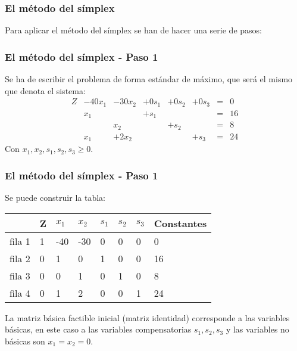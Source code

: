 \documentclass{beamer}
\begin{document}
\begin{frame}
\frametitle{El m\'etodo del s\'implex}
Para aplicar el m\'etodo del s\'implex se han de hacer una serie de pasos:
\end{frame}



\begin{frame}
\frametitle{El m\'etodo del s\'implex - Paso 1}
Se ha de escribir el problema de forma est\'andar de m\'aximo, que ser\'a el mismo que denota el sistema:
\[\left.\begin{array}{rrrrrrrr}
Z & -40x_1 & -30x_2 & +0s_1 & +0s_2& +0s_3 & = & 0 \\
 &  x_1 &  & +s_1 & &  & = & 16 \\
 &  & x_2 &  & +s_2&  & = & 8 \\
  & x_1 & +2x_2 &  & & +s_3 & = & 24 \end{array}\right.\]
Con $x_1,x_2,s_1,s_2,s_3\geq 0$.
\end{frame}

\begin{frame}
\frametitle{El m\'etodo del s\'implex - Paso 1}
Se puede construir la tabla:
\begin{tabular}{ |p{1cm}||p{0.8cm}|p{0.8cm}|p{0.8cm}|p{0.8cm}|p{0.8cm}|p{0.8cm}|p{1.6cm}|  }
 \hline
 & Z & $x_1$ & $x_2$ & $s_1$& $s_2$ & $s_3$ & Constantes \\
 \hline
fila 1 &1 & -40 & -30 & 0& 0& 0 & 0 \\
fila 2 & 0 &  1 & 0 & 1 & 0 & 0 & 16 \\
fila 3 & 0 & 0 & 1 & 0 & 1 & 0  & 8 \\
fila 4 &  0 & 1 & 2 & 0 &0 & 1  & 24\\
      \hline
\end{tabular}

La matriz b\'asica factible inicial (matriz identidad) corresponde a las variables b\'asicas, en este caso a las variables compensatorias $s_1,s_2,s_3$ y las variables no b\'asicas son $x_1=x_2=0$.

\end{frame}
\end{document}
